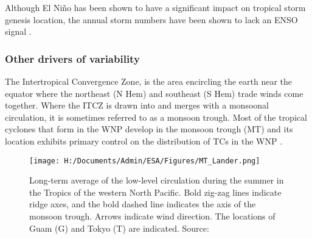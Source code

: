 
Although El Ni\~{n}o has been shown to have a significant impact on tropical storm genesis location, the annual storm numbers have been shown to lack an ENSO signal \citep{lander1994exploratory}.






\subsubsection{Other drivers of variability}

The Intertropical Convergence Zone, is the area encircling the earth near the equator where the northeast (N Hem) and southeast (S Hem) trade winds come together. Where the ITCZ is drawn into and merges with a monsoonal circulation, it is sometimes referred to as a monsoon trough. Most of the tropical cyclones that form in the WNP develop in the monsoon trough (MT) \citep{lander1994exploratory} and its location exhibits primary control on the distribution of TCs in the WNP \citep{wuinfluence}. 

\begin{figure}[h]
	\centering
	\noindent\texttt{[image: H:/Documents/Admin/ESA/Figures/MT\_Lander.png]}
	\caption{Long-term average of the low-level circulation during the summer in the Tropics of the western North Pacific. Bold zig-zag lines indicate ridge axes, and the bold dashed line indicates the axis of the monsoon trough. Arrows indicate wind direction. The locations of Guam (G) and Tokyo (T) are indicated. Source: \cite{lander1996specific}}\label{fig:MT}
\end{figure}

